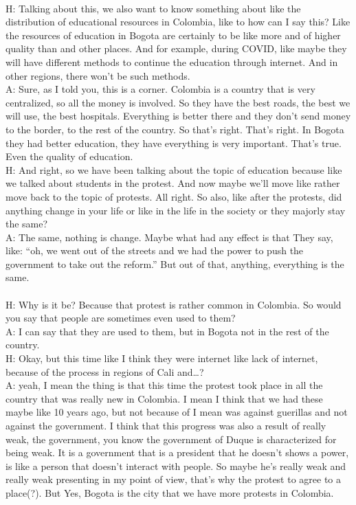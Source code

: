 \documentclass{phyasgn}\usepackage{nag}
\begin{document}
\\
H: Talking about this, we also want to know something about like the distribution of educational resources in Colombia, like to how can I say this? Like the resources of education in Bogota are certainly to be like more and of higher quality than and other places. And for example, during COVID, like maybe they will have different methods to continue the education through internet. And in other regions, there won't be such methods.\\
A: Sure, as I told you, this is a corner. Colombia is a country that is very centralized, so all the money is involved. So they have the best roads, the best we will use, the best hospitals. Everything is better there and they don't send money to the border, to the rest of the country. So that's right. That's right. In Bogota they had better education, they have everything is very important. That's true. Even the quality of education.\\
H: And right, so we have been talking about the topic of education because like we talked about students in the protest. And now maybe we'll move like rather move back to the topic of protests. All right. So also, like after the protests, did anything change in your life or like in the life in the society or they majorly stay the same? \\
A: The same, nothing is change. Maybe what had any effect is that They say, like: “oh, we went out of the streets and we had the power to push the government to take out the reform.” But out of that, anything, everything is the same.\\
\\
H: Why is it be? Because that protest is rather common in Colombia. So would you say that people are sometimes even used to them?\\
A: I can say that they are used to them, but in Bogota not in the rest of the country.\\
H: Okay, but this time like I think they were internet like lack of internet, because of the process in regions of Cali and…?\\
A: yeah, I mean the thing is that this time the protest took place in all the country that was really new in Colombia. I mean I think that we had these maybe like 10 years ago, but not because of I mean was against guerillas and not against the government. I think that this progress was also a result of really weak, the government, you know the government of Duque is characterized for being weak. It is a government that is a president that he doesn't shows a power, is like a person that doesn't interact with people. So maybe he's really weak and really weak presenting in my point of view, that's why the protest to agree to a place(?). But Yes, Bogota is the city that we have more protests in Colombia.\\
\end{document}
